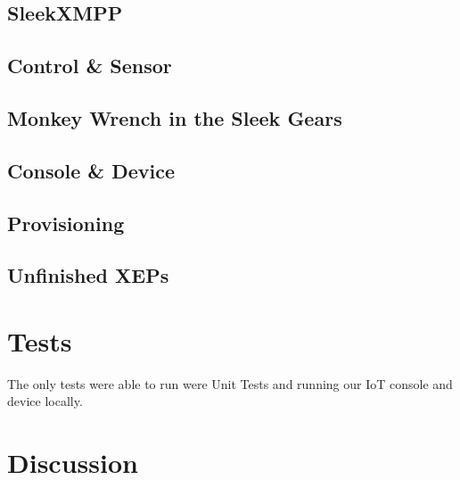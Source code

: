 \documentclass{sig-alternate}
\begin{document}


\subsection{SleekXMPP}



\subsection{Control \& Sensor}



\subsection{Monkey Wrench in the Sleek Gears}



\subsection{Console \& Device}



\subsection{Provisioning}



\subsection{Unfinished XEPs}



\section{Tests}

The only tests were able to run were Unit Tests and running our
IoT console and device locally.

\section{Discussion}


\end{document}
